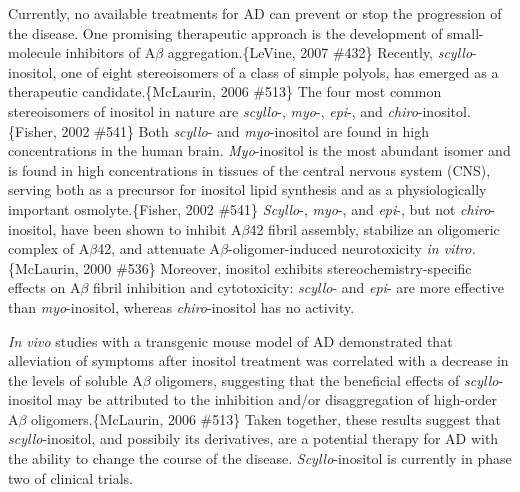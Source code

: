 Currently, no available treatments for AD can prevent or stop the progression of the disease. One promising therapeutic approach is the development of small-molecule inhibitors of A$\beta$ aggregation.\{LeVine, 2007 \#432\} Recently, \emph{scyllo}-inositol, one of eight stereoisomers of a class of simple polyols, has emerged as a therapeutic candidate.\{McLaurin, 2006 \#513\} The four most common stereoisomers of inositol in nature are \emph{scyllo}-, \emph{myo}-, \emph{epi}-, and \emph{chiro}-inositol.\{Fisher, 2002 \#541\} Both \emph{scyllo}- and \emph{myo}-inositol are found in high concentrations in the human brain. \emph{Myo}-inositol is the most abundant isomer and is found in high concentrations in tissues of the central nervous system (CNS), serving both as a precursor for inositol lipid synthesis and as a physiologically important osmolyte.\{Fisher, 2002 \#541\} \emph{Scyllo}-, \emph{myo}-, and \emph{epi}-, but not \emph{chiro}-inositol, have been shown to inhibit A$\beta$42 fibril assembly, stabilize an oligomeric complex of A$\beta$42, and attenuate A$\beta$-oligomer-induced neurotoxicity \emph{in vitro.}\{McLaurin, 2000 \#536\} Moreover, inositol exhibits stereochemistry-specific effects on A$\beta$ fibril inhibition and cytotoxicity: \emph{scyllo}- and \emph{epi}- are more effective than \emph{myo}-inositol, whereas \emph{chiro}-inositol has no activity.

\emph{In vivo} studies with a transgenic mouse model of AD demonstrated that alleviation of symptoms after inositol treatment was correlated with a decrease in the levels of soluble A$\beta$ oligomers, suggesting that the beneficial effects of \emph{scyllo}-inositol may be attributed to the inhibition and/or disaggregation of high-order A$\beta$ oligomers.\{McLaurin, 2006 \#513\} Taken together, these results suggest that \emph{scyllo}-inositol, and possibily its derivatives, are a potential therapy for AD with the ability to change the course of the disease. \emph{Scyllo}-inositol is currently in phase two of clinical trials.


